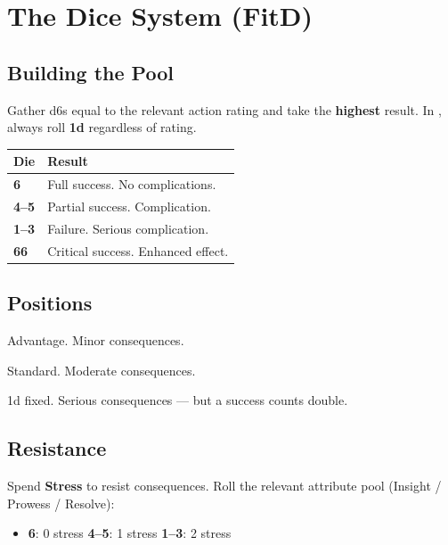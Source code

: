 \section{The Dice System (FitD)}
\label{sec:dice}

\begin{multicols}{2}

\subsection{Building the Pool}

Gather d6s equal to the relevant action rating and take
the \textbf{highest} result. In ,
always roll \textbf{1d} regardless of rating.

\begin{center}
\begin{tabular}{C{1.2cm} p{4.5cm}}
  \toprule
  \textbf{Die} & \textbf{Result} \\
  \midrule
  \textbf{6}   & Full success. No complications. \\
  \textbf{4--5}& Partial success. Complication. \\
  \textbf{1--3}& Failure. Serious complication. \\
  \textbf{66}  & Critical success. Enhanced effect. \\
  \bottomrule
\end{tabular}
\end{center}

\columnbreak

\subsection{Positions}

\begin{description}[leftmargin=2.4cm, labelindent=0pt]
  \item[\idx{Controlled}]  Advantage. Minor consequences.
  \item[\idx{Risky}]       Standard. Moderate consequences.
  \item[\idx{Desperate}]   1d fixed. Serious consequences ---
                           but a success counts double.
\end{description}

\subsection{Resistance}

Spend \textbf{Stress} to resist consequences.
Roll the relevant attribute pool (Insight / Prowess / Resolve):
\begin{itemize}
  \item \textbf{6}: 0 stress \quad \textbf{4--5}: 1 stress \quad \textbf{1--3}: 2 stress
\end{itemize}

\end{multicols}

